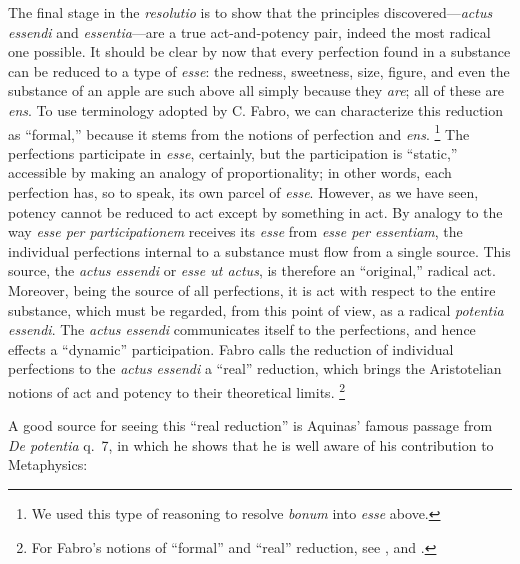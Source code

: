 The final stage in the \emph{resolutio} is to show that the principles discovered---\emph{actus essendi} and \emph{essentia}---are a true act-and-potency pair, indeed the most radical one possible. It should be clear by now that every perfection found in a substance can be reduced to a type of \emph{esse}: the redness, sweetness, size, figure, and even the substance of an apple are such above all simply because they \emph{are}; all of these are \emph{ens}. To use terminology adopted by C. Fabro, we can characterize this reduction as ``formal,'' because it stems from the notions of perfection and \emph{ens}.%
%
\footnote{We used this type of reasoning to resolve \emph{bonum} into \emph{esse} above.} The perfections participate in \emph{esse}, certainly, but the participation is ``static,'' accessible by making an analogy of proportionality; in other words, each perfection has, so to speak, its own parcel of \emph{esse}. However, as we have seen, potency cannot be reduced to act except by something in act. By analogy to the way \emph{esse per participationem} receives its \emph{esse} from \emph{esse per essentiam}, the individual perfections internal to a substance must flow from a single source. This source, the \emph{actus essendi} or \emph{esse ut actus}, is therefore an ``original,'' radical act. Moreover, being the source of all perfections, it is act with respect to the entire substance, which must be regarded, from this point of view, as a radical \emph{potentia essendi}. The \emph{actus essendi} communicates itself to the perfections, and hence effects a ``dynamic'' participation. Fabro calls the reduction of individual perfections to the \emph{actus essendi} a ``real'' reduction, which brings the Aristotelian notions of act and potency to their theoretical limits.%
%
\footnote{For Fabro's notions of ``formal'' and ``real'' reduction, see \cite[108-109]{fabro:problematica}, and \cite[186-187]{fabro:partecipazione}.}

A good source for seeing this ``real reduction'' is Aquinas' famous passage from \emph{De potentia} q.~7, in which he shows that he is well aware of his contribution to Metaphysics:

